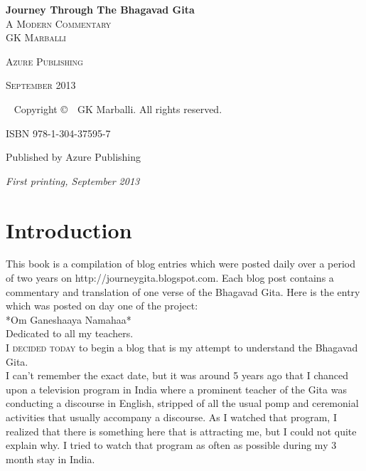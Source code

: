 \documentclass[a5paper,9pt,openany]{memoir}
\newlength\drop
\newcommand*\titleM{\begingroup%
\setlength\drop{0.08\textheight}
\centering
\vspace*{\drop}
{\Huge\bfseries Journey Through The Bhagavad Gita}\\[\baselineskip]
{\scshape A Modern Commentary}\\[\baselineskip]
\vfill
{\large\scshape GK Marballi}\par
\vfill
{\scshape Azure Publishing}\par
{\scshape September 2013}\par
\vspace*{2\drop}
\endgroup}
\begin{document}
\pagestyle{simple}

\frontmatter

\begin{titlingpage}
\titleM
\newpage

~\vfill
Copyright \copyright\ \the\year\ GK Marballi. All rights reserved.\\
\par
ISBN 978-1-304-37595-7\\

\par Published by Azure Publishing\\

\par \textit{First printing, September 2013}\\
\end{titlingpage}

\newpage
\tableofcontents

\newpage

\mainmatter

\chapter*{Introduction}

This book is a compilation of blog entries which were posted daily over a period of two years on http://journeygita.blogspot.com. Each blog post contains a commentary and translation of one verse of the Bhagavad Gita. Here is the entry which was posted on day one of the project:~\\

*Om Ganeshaaya Namahaa*~\\

Dedicated to all my teachers.~\\

\textsc{I decided today} to begin a blog that is my attempt to understand the Bhagavad Gita.~\\

I can't remember the exact date, but it was around 5 years ago that I chanced upon a television program in India where a prominent teacher of the Gita was conducting a discourse in English, stripped of all the usual pomp and ceremonial activities that usually accompany a discourse. As I watched that program, I realized that there is something here that is attracting me, but I could not quite explain why. I tried to watch that program as often as possible during my 3 month stay in India.~\\
\end{document}
